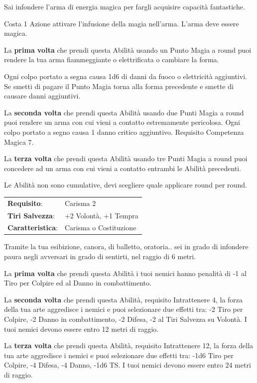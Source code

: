 \begin{multicols}{2}
Sai infondere l'arma di energia magica per fargli acquisire capacità fantastiche.

Costa 1 Azione attivare l'infusione della magia nell'arma. L'arma deve essere magica.

La \textbf{prima volta} che prendi questa Abilità usando un Punto Magia a round puoi rendere la tua arma fiammeggiante o elettrificata o cambiare la forma.

Ogni colpo portato a segna causa 1d6 di danni da fuoco o elettricità aggiuntivi. Se smetti di pagare il Punto Magia torna alla forma precedente e smette di causare danni aggiuntivi.

La \textbf{seconda volta} che prendi questa Abilità usando due Punti Magia a round puoi rendere un arma con cui vieni a contatto estremamente pericolosa. Ogni colpo portato a segno causa 1 danno critico aggiuntivo. Requisito Competenza Magica 7.

La \textbf{terza volta} che prendi questa Abilità usando tre Punti Magia a round puoi concedere ad un arma con cui vieni a contatto entrambi le Abilità precedenti.

Le Abilità non sono cumulative, devi scegliere quale applicare round per round.

\noindent\begin{tabularx}{\linewidth}{>{\raggedright\arraybackslash}p{2.5cm}X}
\rowcolor{gray!20}\textbf{Requisito}: & Carisma 2\\
\textbf{Tiri Salvezza}: & +2 Volontà, +1 Tempra\\
\rowcolor{gray!20}\textbf{Caratteristica}: & Carisma o Costituzione\\
\end{tabularx}\smallskip

Tramite la tua esibizione, canora, di balletto, oratoria.. sei in grado di infondere paura negli avversari in grado di sentirti, nel raggio di 6 metri.

La \textbf{prima volta} che prendi questa Abilità i tuoi nemici hanno penalità di -1 al Tiro per Colpire ed al Danno in combattimento.

La \textbf{seconda volta} che prendi questa Abilità, requisito Intrattenere 4, la forza della tua arte aggredisce i nemici e puoi selezionare due effetti tra: -2 Tiro per Colpire, -2 Danno in combattimento, -2 Difesa, -2 al Tiri Salvezza su Volontà. I tuoi nemici devono essere entro 12 metri di raggio.

La \textbf{terza volta} che prendi questa Abilità, requisito Intrattenere 12, la forza della tua arte aggredisce i nemici e puoi selezionare due effetti tra: -1d6 Tiro per Colpire, -4 Difesa, -4 Danno, -1d6 TS. I tuoi nemici devono essere entro 24 metri di raggio.


\end{multicols}

